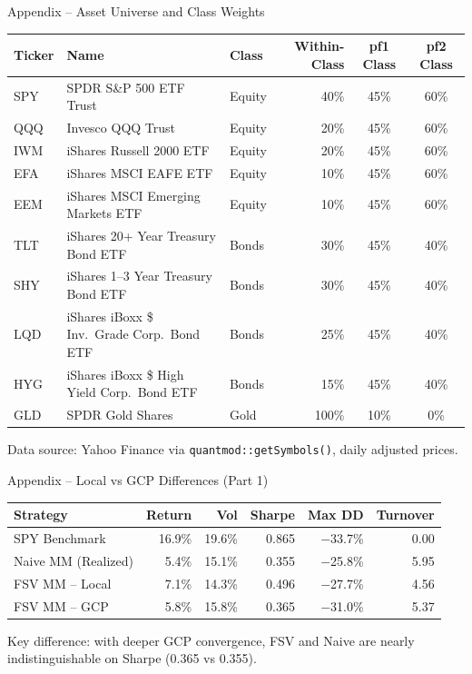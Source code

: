 \documentclass[10pt]{beamer}\usepackage[]{graphicx}\usepackage[table]{xcolor}
\begin{document}
\begin{frame}{Appendix -- Asset Universe and Class Weights}

  {\scriptsize
  \setlength{\tabcolsep}{3pt}
  \begin{tabular}{@{}lllrcc@{}}
    \toprule
    \textbf{Ticker} & \textbf{Name} & \textbf{Class} & \textbf{Within-Class} & \textbf{pf1 Class} & \textbf{pf2 Class} \\
    \midrule
    SPY & SPDR S\&P 500 ETF Trust & Equity & 40\% & 45\% & 60\% \\
    QQQ & Invesco QQQ Trust & Equity & 20\% & 45\% & 60\% \\
    IWM & iShares Russell 2000 ETF & Equity & 20\% & 45\% & 60\% \\
    EFA & iShares MSCI EAFE ETF & Equity & 10\% & 45\% & 60\% \\
    EEM & iShares MSCI Emerging Markets ETF & Equity & 10\% & 45\% & 60\% \\
    \midrule
    TLT & iShares 20+ Year Treasury Bond ETF & Bonds & 30\% & 45\% & 40\% \\
    SHY & iShares 1--3 Year Treasury Bond ETF & Bonds & 30\% & 45\% & 40\% \\
    LQD & iShares iBoxx \$ Inv.\ Grade Corp.\ Bond ETF & Bonds & 25\% & 45\% & 40\% \\
    HYG & iShares iBoxx \$ High Yield Corp.\ Bond ETF & Bonds & 15\% & 45\% & 40\% \\
    \midrule
    GLD & SPDR Gold Shares & Gold & 100\% & 10\% & 0\% \\
    \bottomrule
  \end{tabular}
  }

  \vspace{0.4em}
  {\footnotesize Data source: Yahoo Finance via \texttt{quantmod::getSymbols()}, daily adjusted prices.}

\end{frame}


\begin{frame}{Appendix -- Local vs GCP Differences (Part 1)}
  {\scriptsize
  \setlength{\tabcolsep}{4pt}
  \begin{tabular}{@{}lrrrrr@{}}
    \toprule
    \textbf{Strategy} & \textbf{Return} & \textbf{Vol} & \textbf{Sharpe} & \textbf{Max DD} & \textbf{Turnover} \\
    \midrule
    SPY Benchmark       & 16.9\% & 19.6\% & 0.865 & $-$33.7\% & 0.00 \\
    Naive MM (Realized) & 5.4\%  & 15.1\% & 0.355 & $-$25.8\% & 5.95 \\
    FSV MM -- Local     & 7.1\%  & 14.3\% & 0.496 & $-$27.7\% & 4.56 \\
    FSV MM -- GCP       & 5.8\%  & 15.8\% & 0.365 & $-$31.0\% & 5.37 \\
    \bottomrule
  \end{tabular}
  }

  \vspace{0.5em}
  {\footnotesize Key difference: with deeper GCP convergence, FSV and Naive are nearly indistinguishable on Sharpe (0.365 vs 0.355).}
\end{frame}
\end{document}
